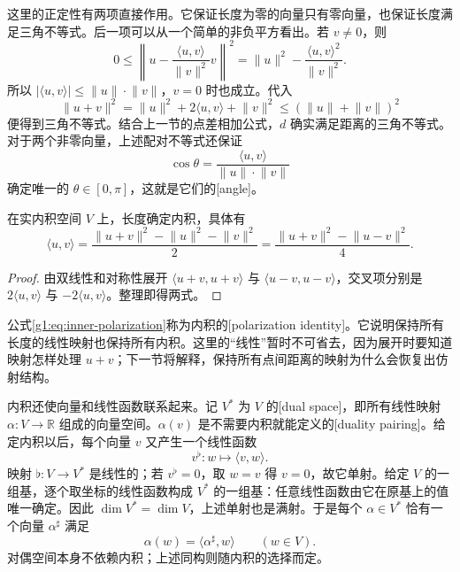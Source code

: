 这里的正定性有两项直接作用。它保证长度为零的向量只有零向量，也保证长度满足三角不等式。后一项可以从一个简单的非负平方看出。若 \(v\ne0\)，则
\[
	0\leq\left\lVert u-\frac{\langle u,v\rangle}{\lVert v\rVert^2}v\right\rVert^2
	=\lVert u\rVert^2-\frac{\langle u,v\rangle^2}{\lVert v\rVert^2}.
\]
所以 \(\lvert\langle u,v\rangle\rvert\leq\lVert u\rVert\cdot\lVert v\rVert\)，\(v=0\) 时也成立。代入
\[
	\lVert u+v\rVert^2=\lVert u\rVert^2+2\langle u,v\rangle+\lVert v\rVert^2
	\leq(\lVert u\rVert+\lVert v\rVert)^2
\]
便得到三角不等式。结合上一节的点差相加公式，\(d\) 确实满足距离的三角不等式。对于两个非零向量，上述配对不等式还保证
\[
	\cos\theta=\frac{\langle u,v\rangle}{\lVert u\rVert\cdot\lVert v\rVert}
\]
确定唯一的 \(\theta\in[0,\pi]\)，这就是它们的[angle]。

\begin{proposition}
	\label{g1:prop:polarization}
	在实内积空间 \(V\) 上，长度确定内积，具体有
	\begin{equation}
		\label{g1:eq:inner-polarization}
		\langle u,v\rangle
		=\frac{\lVert u+v\rVert^2-\lVert u\rVert^2-\lVert v\rVert^2}{2}
		=\frac{\lVert u+v\rVert^2-\lVert u-v\rVert^2}{4}.
	\end{equation}
\end{proposition}

\begin{proof}
	由双线性和对称性展开 \(\langle u+v,u+v\rangle\) 与 \(\langle u-v,u-v\rangle\)，交叉项分别是 \(2\langle u,v\rangle\) 与 \(-2\langle u,v\rangle\)。整理即得两式。
\end{proof}

公式\eqref{g1:eq:inner-polarization}称为内积的[polarization identity]。它说明保持所有长度的线性映射也保持所有内积。这里的“线性”暂时不可省去，因为展开时要知道映射怎样处理 \(u+v\)；下一节将解释，保持所有点间距离的映射为什么会恢复出仿射结构。

\ProseParagraphBreak

内积还使向量和线性函数联系起来。记 \(V^*\) 为 \(V\) 的[dual space]，即所有线性映射 \(\alpha\colon V\rightarrow\mathbb R\) 组成的向量空间。\(\alpha(v)\) 是不需要内积就能定义的[duality pairing]。给定内积以后，每个向量 \(v\) 又产生一个线性函数
\[
	v^\flat\colon w\longmapsto\langle v,w\rangle.
\]
映射 \(\flat\colon V\rightarrow V^*\) 是线性的；若 \(v^\flat=0\)，取 \(w=v\) 得 \(v=0\)，故它单射。给定 \(V\) 的一组基，逐个取坐标的线性函数构成 \(V^*\) 的一组基：任意线性函数由它在原基上的值唯一确定。因此 \(\dim V^*=\dim V\)，上述单射也是满射。于是每个 \(\alpha\in V^*\) 恰有一个向量 \(\alpha^\sharp\) 满足
\[
	\alpha(w)=\langle\alpha^\sharp,w\rangle\qquad(w\in V).
\]
对偶空间本身不依赖内积；上述同构则随内积的选择而定。

